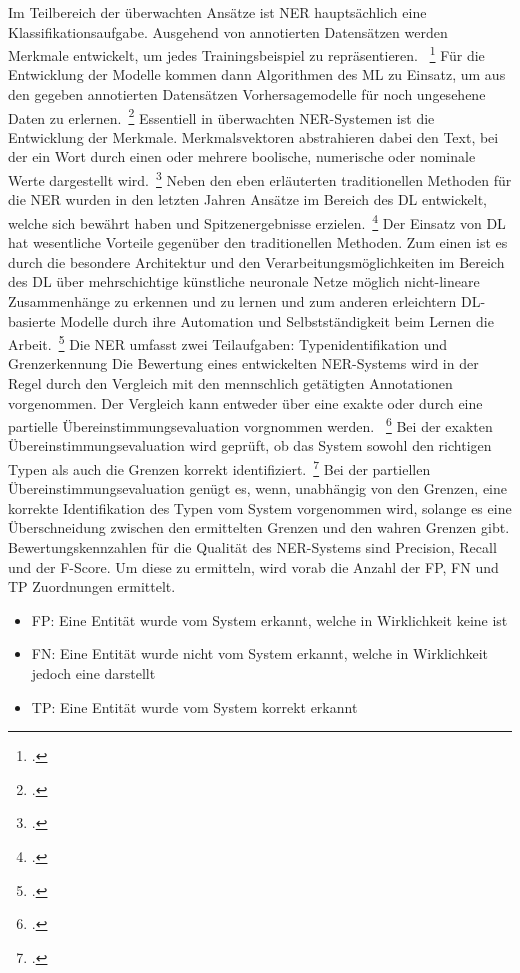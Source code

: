 Im Teilbereich der überwachten Ansätze ist \ac{NER} hauptsächlich eine Klassifikationsaufgabe.
Ausgehend von annotierten Datensätzen werden Merkmale entwickelt, um jedes Trainingsbeispiel zu repräsentieren.
~\footcite[\vglf][]{li.2018}
Für die Entwicklung der Modelle kommen dann Algorithmen des \ac{ML} zu Einsatz, um aus den gegeben annotierten
Datensätzen Vorhersagemodelle für noch ungesehene Daten zu erlernen.~\footcite[\vglf][]{li.2018}
Essentiell in überwachten \ac{NER}-Systemen ist die Entwicklung der Merkmale.
Merkmalsvektoren abstrahieren dabei den Text, bei der ein Wort durch einen oder mehrere boolische, numerische oder
nominale Werte dargestellt wird.~\footcite[\vglf][]{nadeau.2007}\newline
Neben den eben erläuterten traditionellen Methoden für die \ac{NER} wurden in den letzten Jahren Ansätze im Bereich des
\ac{DL} entwickelt, welche sich bewährt haben und Spitzenergebnisse erzielen.~\footcite[\vglf][]{li.2018}
Der Einsatz von \ac{DL} hat wesentliche Vorteile gegenüber den traditionellen Methoden.
Zum einen ist es durch die besondere Architektur und den Verarbeitungsmöglichkeiten im Bereich des \ac{DL} über
mehrschichtige künstliche neuronale Netze möglich nicht-lineare Zusammenhänge zu erkennen und zu lernen und zum anderen
erleichtern \ac{DL}-basierte Modelle durch ihre Automation und Selbstständigkeit beim Lernen die Arbeit.~\footcite
[\vglf][]{li.2018}\newline
\newline
Die \ac{NER} umfasst zwei Teilaufgaben: Typenidentifikation und Grenzerkennung
Die Bewertung eines entwickelten \ac{NER}-Systems wird in der Regel durch den Vergleich mit den mennschlich getätigten
Annotationen vorgenommen.
Der Vergleich kann entweder über eine exakte oder durch eine partielle Übereinstimmungsevaluation vorgnommen werden.
~\footcite[\vglf][ f.]{li.2018}
Bei der exakten Übereinstimmungsevaluation wird geprüft, ob das System sowohl den richtigen Typen als auch die Grenzen
korrekt identifiziert.~\footcite[\vglf][]{tjongkimsang.2003}
Bei der partiellen Übereinstimmungsevaluation genügt es, wenn, unabhängig von den Grenzen, eine korrekte Identifikation
des Typen vom System vorgenommen wird, solange es eine Überschneidung zwischen den ermittelten Grenzen und den wahren
Grenzen gibt.
Bewertungskennzahlen für die Qualität des \ac{NER}-Systems sind Precision, Recall und der F-Score.
Um diese zu ermitteln, wird vorab die Anzahl der \ac{FP}, \ac{FN} und \ac{TP} Zuordnungen ermittelt.
\begin{itemize}
    \item \ac{FP}: Eine Entität wurde vom System erkannt, welche in Wirklichkeit keine ist
    \item \ac{FN}: Eine Entität wurde nicht vom System erkannt, welche in Wirklichkeit jedoch eine darstellt
    \item \ac{TP}: Eine Entität wurde vom System korrekt erkannt
\end{itemize}

